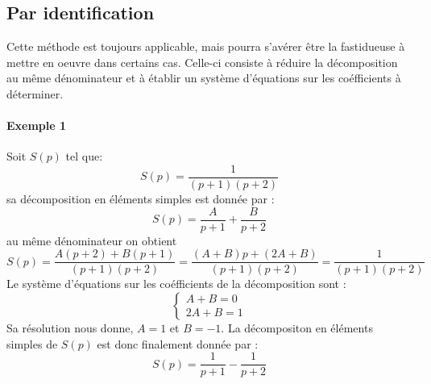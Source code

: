 \subsection{Par identification}
Cette méthode est toujours applicable, mais pourra s'avérer être la fastidueuse
à mettre en oeuvre dans certains cas.
Celle-ci consiste à réduire la décomposition au même dénominateur et à établir
un système d'équations sur les coéfficients à déterminer.

\paragraph{Exemple 1}
Soit $S(p)$ tel que:
$$
S(p)=\dfrac{1}{(p+1)(p+2)}
$$
sa décomposition en éléments simples est donnée par :
$$
S(p)=\dfrac{A}{p+1}+\dfrac{B}{p+2}
$$
au même dénominateur on obtient
$$
S(p)=\dfrac{A(p+2)+B(p+1)}{(p+1)(p+2)}
    =\dfrac{(A+B)p+(2A+B)}{(p+1)(p+2)}
    =\dfrac{1}{(p+1)(p+2)}
$$
Le système d'équations sur les coéfficients de la décomposition sont :
$$
\begin{cases}
    A+B=0\\
    2A+B=1
\end{cases}
$$
Sa résolution nous donne, $A=1$ et $B=-1$.
La décompositon en éléments simples de $S(p)$ est donc finalement donnée 
par :
$$
S(p)=\dfrac{1}{p+1}-\dfrac{1}{p+2}
$$

